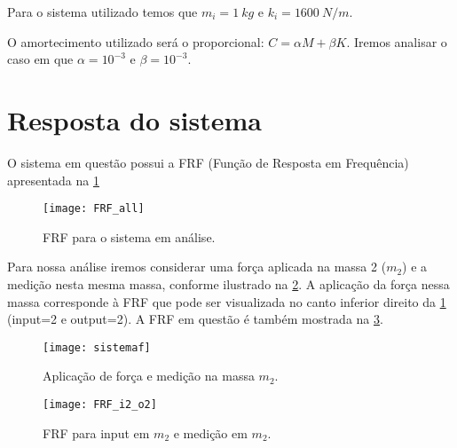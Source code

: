 Para o sistema utilizado temos que $m_i = 1 \ kg$ e $k_i = 1600 \ N/m$.

O amortecimento utilizado será o proporcional: $C = \alpha M + \beta K$. Iremos analisar o caso em que $\alpha = 10^{-3}$ e $\beta = 10^{-3}$.

\section{Resposta do sistema}

O sistema em questão possui a  FRF (Função de Resposta em Frequência) apresentada na \cref{fig:FRF_all}

\begin{figure}[h]
	\centering
	\texttt{[image: FRF\_all]}
	\caption{FRF para o sistema em análise.}
	\label{fig:FRF_all}
\end{figure}

Para nossa análise iremos considerar uma força aplicada na massa 2 ($m_2$) e a medição nesta mesma massa, conforme ilustrado na \cref{fig:sistemaf}. A aplicação da força nessa massa corresponde à FRF que pode ser visualizada no canto inferior direito da \cref{fig:FRF_all} (input=2 e output=2). A FRF em questão é também mostrada na \cref{fig:FRF_i2_o2}.

\begin{figure}
	\centering
	\texttt{[image: sistemaf]}
	\caption{Aplicação de força e medição na massa $m_2$.}
	\label{fig:sistemaf}
\end{figure}

\begin{figure}
	\centering
	\texttt{[image: FRF\_i2\_o2]}
	\caption{FRF para input em $m_2$ e medição em $m_2$.}
	\label{fig:FRF_i2_o2}
\end{figure}




